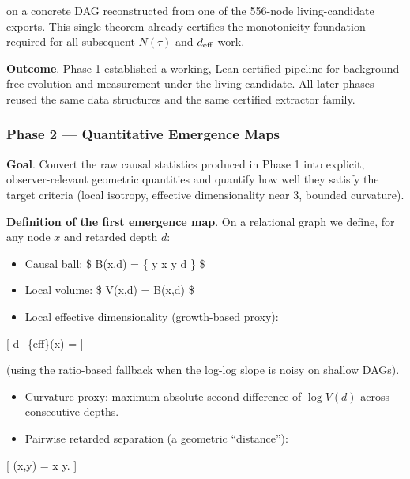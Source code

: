 \documentclass[
  11pt,
  a4paper,
]{article}
\providecommand{\tightlist}{%
  \setlength{\itemsep}{0pt}\setlength{\parskip}{0pt}}
\begin{document}
on a concrete DAG reconstructed from one of the 556-node
living-candidate exports. This single theorem already certifies the
monotonicity foundation required for all subsequent \(N(\tau)\) and
\(d_{\rm eff}\) work.

\textbf{Outcome}. Phase 1 established a working, Lean-certified pipeline
for background-free evolution and measurement under the living
candidate. All later phases reused the same data structures and the same
certified extractor family.

\subsubsection{Phase 2 --- Quantitative Emergence
Maps}\label{phase-2-quantitative-emergence-maps}

\textbf{Goal}. Convert the raw causal statistics produced in Phase 1
into explicit, observer-relevant geometric quantities and quantify how
well they satisfy the target criteria (local isotropy, effective
dimensionality near 3, bounded curvature).

\textbf{Definition of the first emergence map}. On a relational graph we
define, for any node \(x\) and retarded depth \(d\):

\begin{itemize}
\tightlist
\item
  Causal ball: \$ B(x,d) = \{ y \mid {} x
   y \le d \} \$
\item
  Local volume: \$ V(x,d) = \textbar B(x,d)\textbar{} \$
\item
  Local effective dimensionality (growth-based proxy):
\end{itemize}

{[} d\_\{\rm eff\}(x) =
 {]}

(using the ratio-based fallback when the log-log slope is noisy on
shallow DAGs).

\begin{itemize}
\tightlist
\item
  Curvature proxy: maximum absolute second difference of \(\log V(d)\)
  across consecutive depths.
\item
  Pairwise retarded separation (a geometric ``distance''):
\end{itemize}

{[} (x,y) =
 x
 y. {]}
\end{document}
